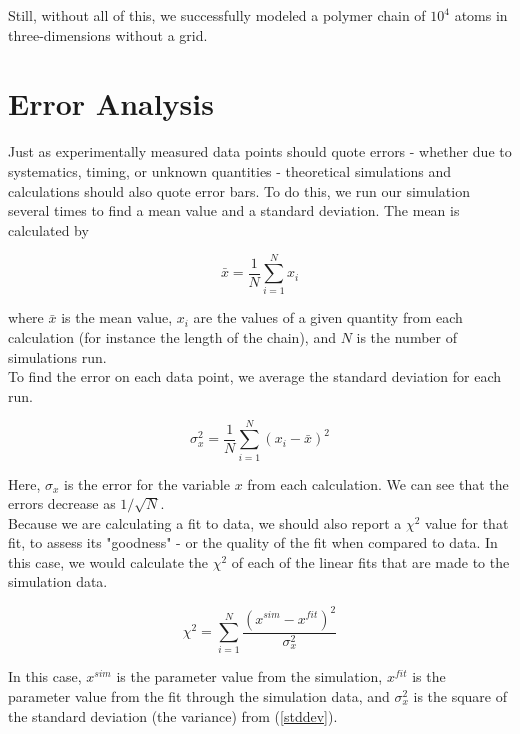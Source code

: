 \documentclass{article}
\begin{document}
\begin{multicols}{2}
Still, without all of this, we successfully modeled a polymer chain of $10^4$ atoms in three-dimensions without a grid.  \\

\appendix

\section{Error Analysis}

Just as experimentally measured data points should quote errors - whether due to systematics, timing, or unknown quantities - theoretical simulations and calculations should also quote error bars.  To do this, we run our simulation several times to find a mean value and a standard deviation.  The mean is calculated by

\begin{equation}
\bar x = \frac{1}{N} \sum \limits _{i=1}^N x_i
\end{equation}

\noindent where $\bar x$ is the mean value, $x_i$ are the values of a given quantity from each calculation (for instance the length of the chain), and $N$ is the number of simulations run.\\

To find the error on each data point, we average the standard deviation for each run.

\begin{equation}
\label{stddev}
\sigma _x^2 = \frac{1}{N} \sum \limits _{i=1} ^N (x_i - \bar x)^2
\end{equation}

\noindent Here, $\sigma _x$ is the error for the variable $x$ from each calculation.  We can see that the errors decrease as $1/\sqrt{N}$.  \\

Because we are calculating a fit to data, we should also report a $\chi ^2$ value for that fit, to assess its "goodness" - or the quality of the fit when compared to data.  \cite{Nunes}  In this case, we would calculate the $\chi^2$ of each of the linear fits that are made to the simulation data.

\begin{equation}
\chi ^2 = \sum \limits _{i=1} ^N \frac{(x^{sim} - x^{fit})^2}{\sigma _x ^2}
\end{equation}

\noindent In this case, $x^{sim}$ is the parameter value from the simulation, $x^{fit}$ is the parameter value from the fit through the simulation data, and $\sigma _x ^2$ is the square of the standard deviation (the variance) from (\ref{stddev}). \\


\end{multicols}
\end{document}
